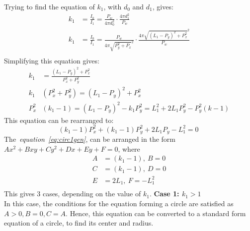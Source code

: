 \documentclass[a4paper,12pt]{article}
\begin{document}
Trying to find the equation of $k_1$, with $d_0$ and $d_1$, gives:
\begin{equation*}
    \begin{split}
        k_1 &= \frac{I_0}{I_1}=\frac{P_w}{4\pi d_0^2}\cdot\frac{4\pi d_1^2}{P_w}\\
        k_1 &= \frac{I_0}{I_1}=\frac{P_w}{4\pi \sqrt{P_y^2+P_x}^2}\cdot\frac{4\pi \sqrt{(L_1-P_y)^2 +P_x^2}^2}{P_w}\\
    \end{split}
\end{equation*}
Simplifying this equation gives:
\begin{equation*}
    \begin{split}
    k_1 &= \frac{(L_1-P_y)^2 + P_x^2}{P_x^2 + P_y^2}\\
    k_1 &(P_x^2 + P_y^2) = (L_1-P_y)^2 + P_x^2\\
    P_x^2 & (k_1-1)  = (L_1-P_y)^2 - k_1P_y^2 = L_1^2 +2L_1P_y^2 -P_y^2(k-1)
    \end{split}
\end{equation*}
This equation can be rearranged to:
\begin{equation}
    (k_1-1)P_x^2 + (k_1-1)P_y^2 +2L_1P_y -L_1^2 =0\
\label{eq:circ1gen}
\end{equation}
The~\textit{equation~\ref{eq:circ1gen}}, can be arranged in the form $Ax^2 +Bxy +Cy^2 +Dx +Ey +F = 0$, where
\begin{equation*}
    \begin{split}
        A&=(k_1-1),~B=0\\
        C&=(k_1-1),~D=0\\
        E&=2L_1,~F=-L_1^2\\
    \end{split}
\end{equation*}
This gives 3 cases, depending on the value of $k_1$.
\textbf{Case 1: $k_1>1$}\\
In this case, the conditions for the equation forming a circle are satisfied as $A>0, B=0, C=A$.  Hence, this equation can be converted to a standard form equation of a circle, to find its center and radius.
\end{document}

